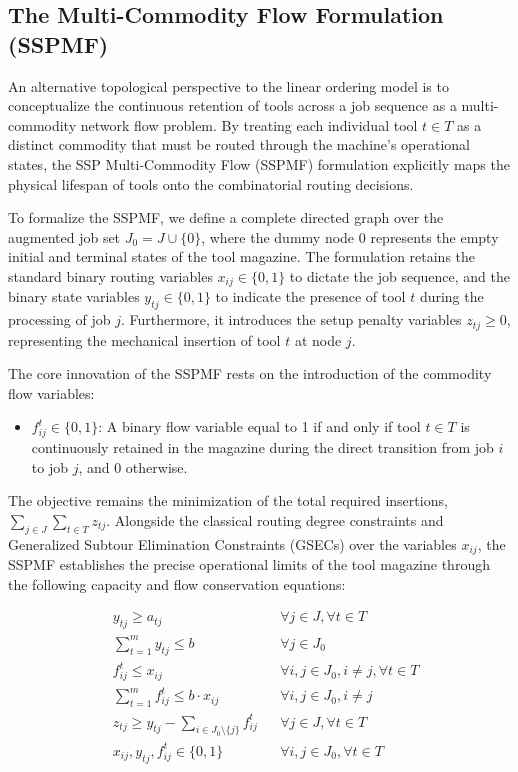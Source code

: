 \documentclass[11pt, a4paper]{book}
\begin{document}
	\subsection{The Multi-Commodity Flow Formulation (SSPMF)}
	
	An alternative topological perspective to the linear ordering model is to conceptualize the continuous retention of tools across a job sequence as a multi-commodity network flow problem. By treating each individual tool $t \in T$ as a distinct commodity that must be routed through the machine's operational states, the SSP Multi-Commodity Flow (SSPMF) formulation explicitly maps the physical lifespan of tools onto the combinatorial routing decisions. 
	
	To formalize the SSPMF, we define a complete directed graph over the augmented job set $J_0 = J \cup \{0\}$, where the dummy node $0$ represents the empty initial and terminal states of the tool magazine. The formulation retains the standard binary routing variables $x_{ij} \in \{0,1\}$ to dictate the job sequence, and the binary state variables $y_{tj} \in \{0,1\}$ to indicate the presence of tool $t$ during the processing of job $j$. Furthermore, it introduces the setup penalty variables $z_{tj} \ge 0$, representing the mechanical insertion of tool $t$ at node $j$.
	
	The core innovation of the SSPMF rests on the introduction of the commodity flow variables:
	\begin{itemize}
		\item $f_{ij}^t \in \{0,1\}$: A binary flow variable equal to 1 if and only if tool $t \in T$ is continuously retained in the magazine during the direct transition from job $i$ to job $j$, and 0 otherwise.
	\end{itemize}
	
	The objective remains the minimization of the total required insertions, $\sum_{j \in J} \sum_{t \in T} z_{tj}$. Alongside the classical routing degree constraints and Generalized Subtour Elimination Constraints (GSECs) over the variables $x_{ij}$, the SSPMF establishes the precise operational limits of the tool magazine through the following capacity and flow conservation equations:
	
	\begin{align}
		& y_{tj} \ge a_{tj} && \forall j \in J, \forall t \in T \label{eq:sspmf_coverage} \\
		& \sum_{t=1}^{m} y_{tj} \le b && \forall j \in J_0 \label{eq:sspmf_capacity} \\
		& f_{ij}^t \le x_{ij} && \forall i, j \in J_0, i \neq j, \forall t \in T \label{eq:sspmf_flow_bound} \\
		& \sum_{t=1}^{m} f_{ij}^t \le b \cdot x_{ij} && \forall i, j \in J_0, i \neq j \label{eq:sspmf_arc_cap} \\
		& z_{tj} \ge y_{tj} - \sum_{i \in J_0 \setminus \{j\}} f_{ij}^t && \forall j \in J, \forall t \in T \label{eq:sspmf_conservation} \\
		& x_{ij}, y_{tj}, f_{ij}^t \in \{0,1\} && \forall i, j \in J_0, \forall t \in T \label{eq:sspmf_binary}
	\end{align}
	
\end{document}
